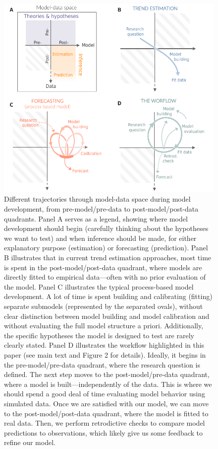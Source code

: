 \documentclass[11pt]{article}
\begin{document}
\begin{figure}
	\centering
	\includegraphics{../figures/figure_modeldataspaces_revised}
	\caption{Different trajectories through model-data space during model development, from pre-model/pre-data to post-model/post-data quadrants.
	Panel A serves as a legend, showing where model development should begin (carefully thinking about the hypotheses we want to test) and when inference should be made, for either explanatory purpose (estimation) or forecasting (prediction).
	Panel B illustrates that in current trend estimation approaches, most time is spent in the post-model/post-data quadrant, where models are directly fitted to empirical data---often with no prior evaluation of the model.
	Panel C illustrates the typical process-based model development. A lot of time is spent building and calibrating (fitting) separate submodels (represented by the separated ovals), without clear distinction between model building and model calibration and without evaluating the full model structure a priori. Additionally, the specific hypotheses the model is designed to test are rarely clearly stated.
	Panel D illustrates the workflow highlighted in this paper (see main text and Figure 2 for details). Ideally, it begins in the pre-model/pre-data quadrant, where the research question is defined. The next step moves to the post-model/pre-data quadrant, where a model is built---independently of the data. This is where we should spend a good deal of time evaluating model behavior using simulated data. Once we are satisfied with our model, we can move to the post-model/post-data quadrant, where the model is fitted to real data. Then, we perform retrodictive checks to compare model predictions to observations, which likely give us some feedback to refine our model.}
	\label{fig:modeldata}
\end{figure}
\end{document}
